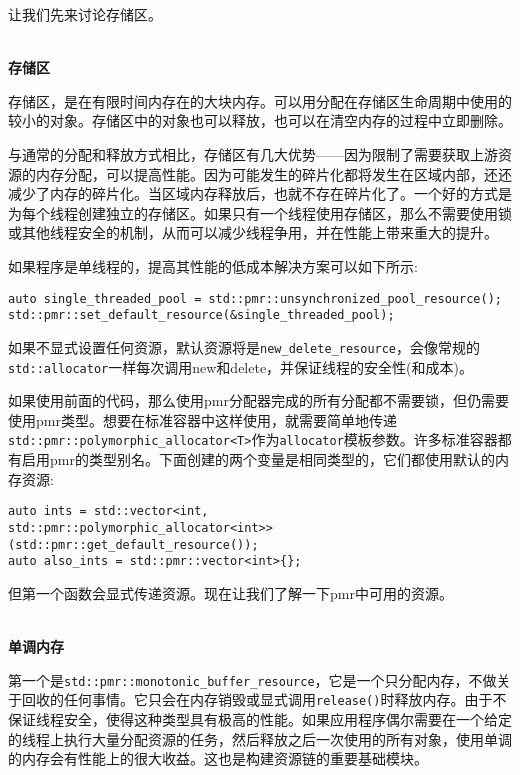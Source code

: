 让我们先来讨论存储区。

\hspace*{\fill} \\ %
\noindent
\textbf{存储区}

存储区，是在有限时间内存在的大块内存。可以用分配在存储区生命周期中使用的较小的对象。存储区中的对象也可以释放，也可以在清空内存的过程中立即删除。

与通常的分配和释放方式相比，存储区有几大优势——因为限制了需要获取上游资源的内存分配，可以提高性能。因为可能发生的碎片化都将发生在区域内部，还还减少了内存的碎片化。当区域内存释放后，也就不存在碎片化了。一个好的方式是为每个线程创建独立的存储区。如果只有一个线程使用存储区，那么不需要使用锁或其他线程安全的机制，从而可以减少线程争用，并在性能上带来重大的提升。

如果程序是单线程的，提高其性能的低成本解决方案可以如下所示:

\begin{lstlisting}[style=styleCXX]
auto single_threaded_pool = std::pmr::unsynchronized_pool_resource();
std::pmr::set_default_resource(&single_threaded_pool);
\end{lstlisting}

如果不显式设置任何资源，默认资源将是\texttt{new\_delete\_resource}，会像常规的\texttt{std::allocator}一样每次调用new和delete，并保证线程的安全性(和成本)。

如果使用前面的代码，那么使用pmr分配器完成的所有分配都不需要锁，但仍需要使用pmr类型。想要在标准容器中这样使用，就需要简单地传递\texttt{std::pmr::polymorphic\_allocator<T>}作为\texttt{allocator}模板参数。许多标准容器都有启用pmr的类型别名。下面创建的两个变量是相同类型的，它们都使用默认的内存资源:

\begin{lstlisting}[style=styleCXX]
auto ints = std::vector<int,
std::pmr::polymorphic_allocator<int>>(std::pmr::get_default_resource());
auto also_ints = std::pmr::vector<int>{};
\end{lstlisting}

但第一个函数会显式传递资源。现在让我们了解一下pmr中可用的资源。

\hspace*{\fill} \\ %
\noindent
\textbf{单调内存}

第一个是\texttt{std::pmr::monotonic\_buffer\_resource}，它是一个只分配内存，不做关于回收的任何事情。它只会在内存销毁或显式调用\texttt{release()}时释放内存。由于不保证线程安全，使得这种类型具有极高的性能。如果应用程序偶尔需要在一个给定的线程上执行大量分配资源的任务，然后释放之后一次使用的所有对象，使用单调的内存会有性能上的很大收益。这也是构建资源链的重要基础模块。

